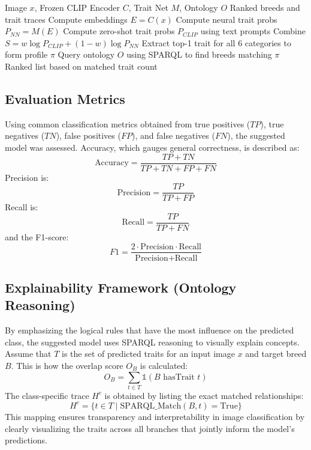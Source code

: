 \documentclass[conference]{IEEEtran}
\begin{document}
\begin{algorithm}
\caption{Neuro-Symbolic Breed Classification Algorithm}
\begin{algorithmic}[1]
\REQUIRE Image $x$, Frozen CLIP Encoder $C$, Trait Net $M$, Ontology $O$
\ENSURE Ranked breeds and trait traces
\STATE Compute embeddings $E = C(x)$
\STATE Compute neural trait probs $P_{NN} = M(E)$
\STATE Compute zero-shot trait probs $P_{CLIP}$ using text prompts
\STATE Combine $S = w \log P_{CLIP} + (1-w) \log P_{NN}$
\STATE Extract top-1 trait for all 6 categories to form profile $\pi$
\STATE Query ontology $O$ using SPARQL to find breeds matching $\pi$
\RETURN Ranked list based on matched trait count
\end{algorithmic}
\label{alg1}
\end{algorithm}

\subsection{Evaluation Metrics}
Using common classification metrics obtained from true positives ($TP$), true negatives ($TN$), false positives ($FP$), and false negatives ($FN$), the suggested model was assessed. Accuracy, which gauges general correctness, is described as:
\begin{equation}
\text{Accuracy} = \frac{TP + TN}{TP + TN + FP + FN} \label{eq8}
\end{equation}
Precision is:
\begin{equation}
\text{Precision} = \frac{TP}{TP + FP} \label{eq9}
\end{equation}
Recall is:
\begin{equation}
\text{Recall} = \frac{TP}{TP + FN} \label{eq10}
\end{equation}
and the F1-score:
\begin{equation}
F1 = \frac{2 \cdot \text{Precision} \cdot \text{Recall}}{\text{Precision} + \text{Recall}} \label{eq11}
\end{equation}

\subsection{Explainability Framework (Ontology Reasoning)}
By emphasizing the logical rules that have the most influence on the predicted class, the suggested model uses SPARQL reasoning to visually explain concepts. Assume that $T$ is the set of predicted traits for an input image $x$ and target breed $B$. This is how the overlap score $O_B$ is calculated:
\begin{equation}
O_B = \sum_{t \in T} \mathbb{1}(B \text{ hasTrait } t) \label{eq12}
\end{equation}
The class-specific trace $H^c$ is obtained by listing the exact matched relationships:
\begin{equation}
H^c = \{ t \in T \mid \text{SPARQL\_Match}(B, t) = \text{True} \} \label{eq13}
\end{equation}
This mapping ensures transparency and interpretability in image classification by clearly visualizing the traits across all branches that jointly inform the model's predictions.
\end{document}
